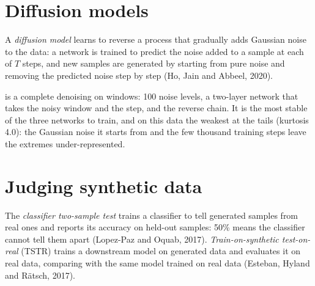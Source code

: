 \section{Diffusion models}

\begin{definition}\label{def:ml:generative-models-and-synthetic-data:diffusion}
A \emph{diffusion model} learns to reverse a process that gradually adds Gaussian noise to the data:
a network is trained to predict the noise added to a sample at each of $T$ steps, and new samples are generated by starting
from pure noise and removing the predicted noise step by step (Ho, Jain and Abbeel, 2020).
\end{definition}

 is a complete denoising  on windows: 100 noise levels, a two-layer network that
takes the noisy window and the step, and the reverse chain. It is the most stable of the three networks to train, and on
this data the weakest at the tails (kurtosis 4.0): the Gaussian noise it starts from and the few thousand training steps
leave the extremes under-represented.

\section{Judging synthetic data}

\begin{definition}\label{def:ml:generative-models-and-synthetic-data:tests}
The \emph{classifier two-sample test} trains a classifier to tell generated samples from
real ones and reports its accuracy on held-out samples: 50\% means the classifier cannot tell them apart (Lopez-Paz and
Oquab, 2017). \emph{Train-on-synthetic test-on-real} (TSTR) trains a downstream model
on generated data and evaluates it on real data, comparing with the same model trained on real data (Esteban, Hyland and
Rätsch, 2017).
\end{definition}

